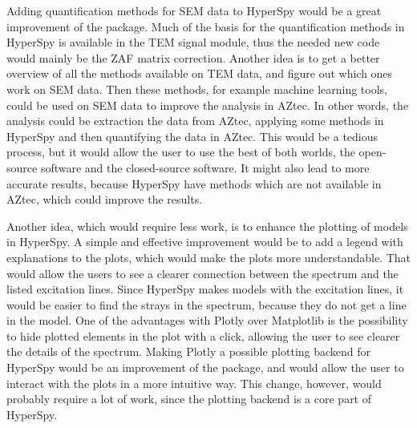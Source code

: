 Adding quantification methods for SEM data to HyperSpy would be a great improvement of the package.
Much of the basis for the quantification methods in HyperSpy is available in the TEM signal module, thus the needed new code would mainly be the ZAF matrix correction.
Another idea is to get a better overview of all the methods available on TEM data, and figure out which ones work on SEM data.
Then these methods, for example machine learning tools, could be used on SEM data to improve the analysis in AZtec.
In other words, the analysis could be extraction the data from AZtec, applying some methods in HyperSpy and then quantifying the data in AZtec.
This would be a tedious process, but it would allow the user to use the best of both worlds, the open-source software and the closed-source software.
It might also lead to more accurate results, because HyperSpy have methods which are not available in AZtec, which could improve the results.

Another idea, which would require less work, is to enhance the plotting of models in HyperSpy.
A simple and effective improvement would be to add a legend with explanations to the plots, which would make the plots more understandable.
That would allow the users to see a clearer connection between the spectrum and the listed excitation lines.
Since HyperSpy makes models with the excitation lines, it would be easier to find the strays in the spectrum, because they do not get a line in the model.
One of the advantages with Plotly over Matplotlib is the possibility to hide plotted elements in the plot with a click, allowing the user to see clearer the details of the spectrum.
Making Plotly a possible plotting backend for HyperSpy would be an improvement of the package, and would allow the user to interact with the plots in a more intuitive way.
This change, however, would probably require a lot of work, since the plotting backend is a core part of HyperSpy.


